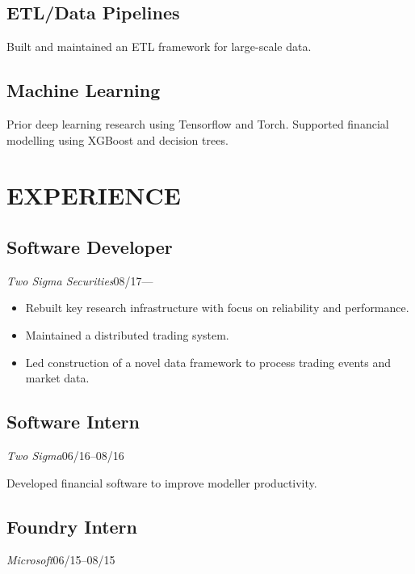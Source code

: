 \documentclass[11pt]{article}
\begin{document}
\begin{minipage}[t]{0.40\textwidth}
  \medskip
  \subsection*{ETL/Data Pipelines}
  Built and maintained an ETL framework for large-scale data.

  \medskip
  \subsection*{Machine Learning}
  Prior deep learning research using Tensorflow and Torch.
  Supported financial modelling using XGBoost and decision trees.


\end{minipage}\hspace{0.04\textwidth}
\begin{minipage}[t]{0.55\textwidth}
  \section*{\LARGE EXPERIENCE}

  \subsection*{Software Developer}
  \emph{Two Sigma Securities}\hfill08/17---
  \smallskip

  \begin{itemize}
    \item Rebuilt key research infrastructure with focus on reliability and performance.
    \item Maintained a distributed trading system.
    \item Led construction of a novel data framework to process trading events and market data.
  \end{itemize}

  \medskip
  \subsection*{Software Intern}
  \emph{Two Sigma}\hfill 06/16--08/16
  \smallskip

  Developed financial software to improve modeller productivity.

  \medskip
  \subsection*{Foundry Intern}
  \emph{Microsoft}\hfill 06/15--08/15
  \smallskip


\end{minipage}
\end{document}
